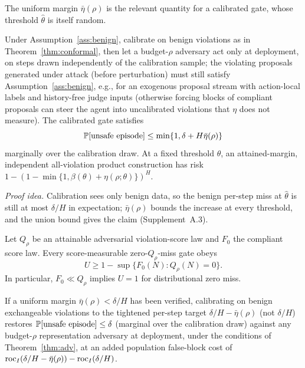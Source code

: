 The uniform margin $\bar\eta(\rho)$ is the relevant quantity for a calibrated
gate, whose threshold $\hat\theta$ is itself random.

\begin{theorem}\label{thm:adv}
Under Assumption~\ref{ass:benign}, calibrate on benign violations as in
Theorem~\ref{thm:conformal}, then let a budget-$\rho$ adversary act only at
deployment, on steps drawn independently of the calibration sample; the violating
proposals generated under attack (before perturbation) must still satisfy
Assumption~\ref{ass:benign}, e.g., for an exogenous proposal stream with action-local labels and
history-free judge inputs (otherwise forcing
blocks of compliant proposals can steer the agent into uncalibrated violations that
$\eta$ does not measure). The
calibrated gate satisfies
\[
\mathbb{P}[\text{unsafe episode}]\le\min\{1,\delta+H\bar\eta(\rho)\}
\]
marginally over the calibration draw. At a fixed threshold $\theta$, an
attained-margin, independent all-violation product construction has risk
$1-(1-\min\{1,\beta(\theta)+\eta(\rho;\theta)\})^H$.
\end{theorem}

\noindent\emph{Proof idea.} Calibration sees only benign data, so
the benign per-step miss at $\hat\theta$ is still at most $\delta/H$ in expectation; $\bar\eta(\rho)$ bounds the
increase at every threshold, and the union bound gives the claim (Supplement~A.3).

\begin{proposition}\label{prop:zero-miss}
Let $Q_\rho$ be an attainable adversarial violation-score law and $F_0$ the
compliant score law. Every score-measurable zero-$Q_\rho$-miss gate obeys
\[
U\ge1-\sup\{F_0(N):Q_\rho(N)=0\}.
\]
In particular, $F_0\ll Q_\rho$ implies $U=1$ for distributional zero miss.
\end{proposition}

\begin{corollary}
\label{cor:robust}
If a uniform margin $\bar\eta(\rho)<\delta/H$ has been verified, calibrating on
benign exchangeable violations to the tightened per-step target
$\delta/H-\bar\eta(\rho)$ (not $\delta/H$) restores
$\mathbb{P}[\text{unsafe episode}]\le\delta$ (marginal over the calibration draw) against any
budget-$\rho$ representation adversary at deployment, under the conditions of
Theorem~\ref{thm:adv}, at an added population false-block cost of
$\mathrm{roc}_I(\delta/H-\bar\eta(\rho))-\mathrm{roc}_I(\delta/H)$.
\end{corollary}

